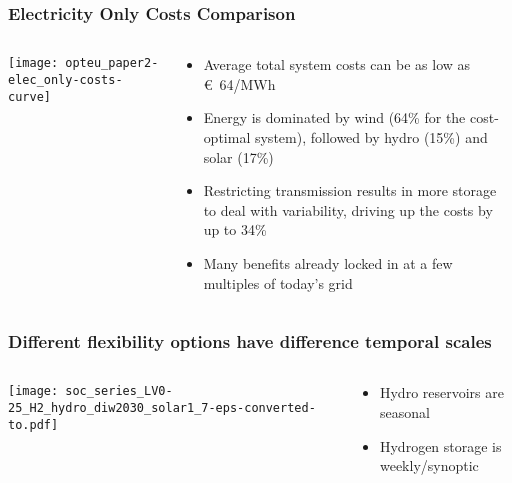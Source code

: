 \documentclass[10pt,aspectratio=169,dvipsnames]{beamer}
\let\olditem\item
\renewcommand{\item}{%
\olditem\vspace{5pt}}
\begin{document}
\begin{frame}
  \frametitle{Electricity Only Costs Comparison}

\begin{columns}[T]
  \begin{column}{9cm}

    \vspace{0.5cm}
  \texttt{[image: opteu\_paper2-elec\_only-costs-curve]}

  \end{column}

  \begin{column}{5cm}
    \begin{itemize}
    \item Average total system costs can be as low as \euro~64/MWh
     \item Energy is dominated by wind (64\% for the cost-optimal system), followed
       by hydro (15\%) and solar (17\%)
     \item Restricting transmission results in more storage to deal with variability, driving up the costs by up to 34\%
     \item Many benefits already locked in at a few multiples of today's grid
    \end{itemize}

  \end{column}

\end{columns}
\end{frame}



\begin{frame}
  \frametitle{Different flexibility options have difference temporal scales}

\begin{columns}[T]
  \begin{column}{10.5cm}

    \vspace{0.5cm}
  \texttt{[image: soc\_series\_LV0-25\_H2\_hydro\_diw2030\_solar1\_7-eps-converted-to.pdf]}

  \end{column}

  \begin{column}{3cm}
    \vspace{1cm}
    \begin{itemize}
    \item Hydro reservoirs are \alert{seasonal}
    \item Hydrogen storage is \alert{weekly/synoptic}
    \end{itemize}

  \end{column}

\end{columns}
\end{frame}
\end{document}
